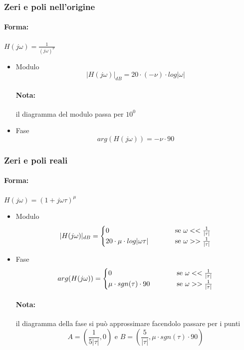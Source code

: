 \documentclass[a4paper]{article}
\begin{document}
	\newpage
	\subsubsection{Zeri e poli nell'origine}
	\paragraph{Forma:} $H(j\omega)=\frac{1}{(j\omega)^\nu}$
	\begin{itemize}
		\item Modulo
			\[
			|H(j\omega)|_{dB} = 20 \cdot (-\nu) \cdot log|\omega|
			\]
			\paragraph{Nota:}
			il diagramma del modulo passa per $10^0$
		\item Fase
			\[
			arg(H(j\omega)) = -\nu \cdot 90
			\]
	\end{itemize}
	
	\subsubsection{Zeri e poli reali}
	\paragraph{Forma:} $H(j\omega)=(1+j\omega\tau)^\mu$
	\begin{itemize}
		\item Modulo
			\[
			|H(j\omega)|_{dB} =
				\begin{cases}
				0& \hspace{1.0cm} \text{se } \omega << \frac{1}{|\tau|} \\
				20\cdot \mu \cdot log|\omega\tau|& \hspace{1.0cm} \text{se } \omega >> \frac{1}{|\tau|}
				\end{cases}
			\]
		\item Fase
			\[
			arg(H(j\omega)) =
				\begin{cases}
				0& \hspace{1.0cm} \text{se } \omega << \frac{1}{|\tau|} \\
				\mu \cdot sgn(\tau) \cdot 90& \hspace{1.0cm} \text{se } \omega >> \frac{1}{|\tau|}
				\end{cases}
			\]
			\paragraph{Nota:}
			il diagramma della fase si può approssimare facendolo passare per i punti
			\[
			A = \left( \frac{1}{5|\tau|}, 0 \right) \text{ e } B = \left( \frac{5}{|\tau|}, \mu \cdot sgn(\tau) \cdot 90 \right)
			\]
	\end{itemize}
	
\end{document}
